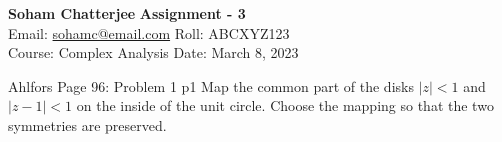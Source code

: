 \documentclass[a4paper, 11pt]{article}
\begin{document}

\textsf{\noindent \large\textbf{Soham Chatterjee} \hfill \textbf{Assignment - 3}\\
    Email: \href{sohamc@cmi.ac.in}{sohamc@email.com} \hfill Roll: ABCXYZ123\\
    \normalsize Course: Complex Analysis \hfill Date: March 8, 2023}


\begin{problem}{%
Ahlfors Page 96: Problem 1
}{p1
}
Map the common part of the disks $|z|<1$ and $|z-1|<1$ on the inside of the unit circle. Choose the mapping so that the two symmetries are preserved.
\end{problem}
\end{document}
